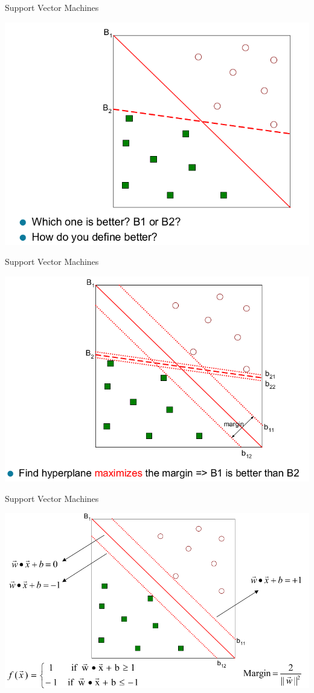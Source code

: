 \documentclass{beamer}
\begin{document}
\begin{frame}{Support Vector Machines}
    \begin{center}
        \includegraphics[scale=0.32]{svm5.png}
    \end{center}
\end{frame}
\begin{frame}{Support Vector Machines}
    \begin{center}
        \includegraphics[scale=0.32]{svm6.png}
    \end{center}
\end{frame}
\begin{frame}{Support Vector Machines}
    \begin{center}
        \includegraphics[scale=0.32]{svm7.png}
    \end{center}
\end{frame}
\end{document}
